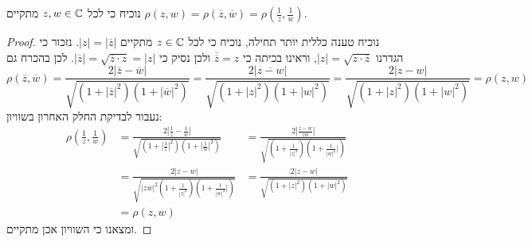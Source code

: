 \Subquestion{}
נוכיח כי לכל $z, w \in \mathbb{C}$ מתקיים $\rho(z, w) = \rho(\overline{z}, \overline{w}) = \rho(\frac{1}{z}, \frac{1}{w})$.
\begin{proof}
	נוכיח טענה כללית יותר תחילה, נוכיח כי לכל $z \in \mathbb{C}$ מתקיים $|z| = |\overline{z}|$.
	נזכור כי הגדרנו $|z| = \sqrt{z \cdot \overline{z}}$, וראינו בכיתה כי $\overline{\overline{z}} = z$ ולכן נסיק כי $|\overline{z}| = \sqrt{\overline{z} \cdot z} = |z|$.
	לכן בהכרח גם
	\[
		\rho(\overline{z}, \overline{w})
		= \frac{2|\overline{z} - \overline{w}|}{\sqrt{(1 + {|\overline{z}|}^2)(1 + {|\overline{w}|}^2)}}
		= \frac{2|\overline{z - w}|}{\sqrt{(1 + {|z|}^2)(1 + {|w|}^2)}}
		= \frac{2|z - w|}{\sqrt{(1 + {|z|}^2)(1 + {|w|}^2)}}
		= \rho(z, w)
	\]
	נעבור לבדיקת החלק האחרון בשוויון:
	\begin{align*}
		 \rho(\frac{1}{z}, \frac{1}{w})
		& = \frac{2|\frac{1}{z} - \frac{1}{w}|}{\sqrt{(1 + {|\frac{1}{z}|}^2)(1 + {|\frac{1}{w}|}^2)}}
		& = \frac{2|\frac{z - w}{zw}|}{\sqrt{(1 + \frac{1}{{|z|}^2})(1 + \frac{1}{{|w|}^2}|)}} \\
		& = \frac{2|z - w|}{\sqrt{{|zw|}^2 (1 + \frac{1}{{|z|}^2})(1 + \frac{1}{{|w|}^2}|)}}
		& = \frac{2|z - w|}{\sqrt{(1 + {|z|}^2)(1 + {|w|}^2)}} \\
		& = \rho(z, w)
	\end{align*}
	ומצאנו כי השוויון אכן מתקיים.
\end{proof}


